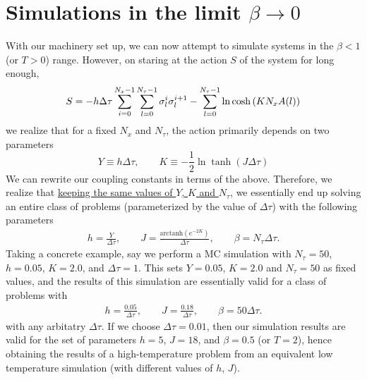 \documentclass[../journal_main.tex]{subfiles}
\begin{document}
\section{Simulations in the limit $\beta \to 0$}
With our machinery set up, we can now attempt to simulate systems in the $\beta < 1$ (or $T>0$) range. However, on staring at the action $S$ of the system for long enough,
\[
    S = -h \Delta\tau \sum_{i=0}^{N_x - 1} \sum_{l=0}^{N_\tau -1} \sigma^{i}_{l} \sigma^{i+1}_{l} - \sum_{l=0}^{N_\tau - 1} \ln \cosh \qty(K N_x A(l)) 
\]
we realize that for a fixed $N_x$ and $N_\tau$, the action primarily depends on two parameters
\[
    Y \equiv h \Delta \tau, \qquad K \equiv -\frac{1}{2} \ln \tanh(J \Delta \tau )
\]  
We can rewrite our coupling constants in terms of the above. Therefore, we realize that \ul{keeping the same values of $Y$, $K$ and $N_\tau$}, we essentially end up solving an entire class of problems (parameterized by the value of $\Delta \tau $) with the following parameters
\begin{align*}
    h = \frac{Y}{\Delta \tau}, \qquad J = \frac{\text{arctanh}(e^{-2K})}{\Delta \tau }, \qquad \beta = N_\tau \Delta \tau. 
\end{align*}
Taking a concrete example, say we perform a MC simulation with $N_\tau = 50$, $h = 0.05$, $K = 2.0$, and $\Delta \tau = 1$. This sets $Y = 0.05$, $K = 2.0$ and $N_\tau = 50$ as fixed values, and the results of this simulation are essentially valid for a class of problems with 
\begin{align*}
    h = \frac{0.05}{\Delta \tau}, \qquad J = \frac{0.18}{\Delta \tau }, \qquad \beta = 50 \Delta \tau. 
\end{align*}  
with any arbitatry $\Delta \tau$. If we choose $\Delta \tau = 0.01$, then our simulation results are valid for the set of parameters $h = 5$, $J = 18$, and $\beta = 0.5$ (or $T = 2$), hence obtaining the results of a high-temperature problem from an equivalent low temperature simulation (with different values of $h$, $J$).
\end{document}
